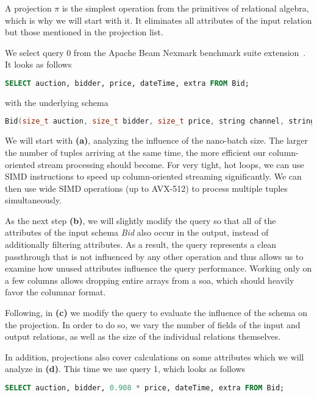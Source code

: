 A projection $\pi$ is the simplest operation from the primitives of relational algebra, which is why we will start with it.
It eliminates all attributes of the input relation but those mentioned in the projection list.

We select query 0 from the Apache Beam Nexmark benchmark suite extension~\cite[]{apachebeam}.
It looks as follows

\begin{lstlisting}[language=SQL]
SELECT auction, bidder, price, dateTime, extra FROM Bid;
\end{lstlisting}
with the underlying schema
\begin{lstlisting}[language=c++]
Bid(size_t auction, size_t bidder, size_t price, string channel, string url, time_t dateTime, string extra);
\end{lstlisting}

We will start with \textbf{(a)}, analyzing the influence of the nano-batch size.
The larger the number of tuples arriving at the same time, the more efficient our column-oriented stream processing should become.
For very tight, hot loops, we can use SIMD instructions to speed up column-oriented streaming significantly.
We can then use wide SIMD operations (up to AVX-512) to process multiple tuples simultaneously.

As the next step \textbf{(b)}, we will slightly modify the query so that all of the attributes of the input schema \emph{Bid} also occur in the output, instead of additionally filtering attributes.
As a result, the query represents a clean passthrough that is not influenced by any other operation and thus allows us to examine how unused attributes influence the query performance.
Working only on a few columns allows dropping entire arrays from a \ac{soa}, which should heavily favor the columnar format.

Following, in \textbf{(c)} we modify the query to evaluate the influence of the schema on the projection.
In order to do so, we vary the number of fields of the input and output relations, as well as the size of the individual relations themselves.

In addition, projections also cover calculations on some attributes which we will analyze in \textbf{(d)}.
This time we use query 1, which looks as follows

\begin{lstlisting}[language=SQL]
SELECT auction, bidder, 0.908 * price, dateTime, extra FROM Bid;
\end{lstlisting}

